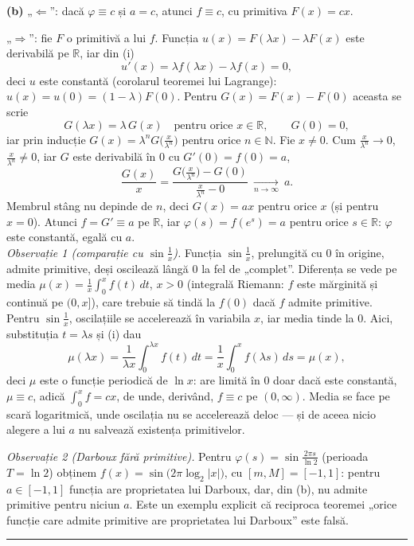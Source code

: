 \textbf{(b)} „$\Leftarrow$'': dacă $\varphi\equiv c$ și $a=c$, atunci $f\equiv c$, cu primitiva $F(x)=cx$.

„$\Rightarrow$'': fie $F$ o primitivă a lui $f$. Funcția $u(x)=F(\lambda x)-\lambda F(x)$ este derivabilă pe $\mathbb{R}$, iar din (i)
\[ u'(x)=\lambda f(\lambda x)-\lambda f(x)=0 , \]
deci $u$ este constantă (corolarul teoremei lui Lagrange): $u(x)=u(0)=(1-\lambda)F(0)$. Pentru $G(x)=F(x)-F(0)$ aceasta se scrie
\[ G(\lambda x)=\lambda\,G(x)\quad\text{pentru orice }x\in\mathbb{R},\qquad G(0)=0 , \]
iar prin inducție $G(x)=\lambda^{n}G\bigl(\frac{x}{\lambda^{n}}\bigr)$ pentru orice $n\in\mathbb{N}$. Fie $x\neq0$. Cum $\frac{x}{\lambda^{n}}\to0$, $\frac{x}{\lambda^{n}}\neq0$, iar $G$ este derivabilă în $0$ cu $G'(0)=f(0)=a$,
\[ \frac{G(x)}{x}=\frac{G\bigl(\frac{x}{\lambda^{n}}\bigr)-G(0)}{\frac{x}{\lambda^{n}}-0}\ \xrightarrow[n\to\infty]{}\ a . \]
Membrul stâng nu depinde de $n$, deci $G(x)=ax$ pentru orice $x$ (și pentru $x=0$). Atunci $f=G'\equiv a$ pe $\mathbb{R}$, iar $\varphi(s)=f(e^{s})=a$ pentru orice $s\in\mathbb{R}$: $\varphi$ este constantă, egală cu $a$.\\[2pt]
\emph{Observație 1 (comparație cu $\sin\frac1x$).} Funcția $\sin\frac1x$, prelungită cu $0$ în origine, admite primitive, deși oscilează lângă $0$ la fel de „complet''. Diferența se vede pe media $\mu(x)=\frac1x\int_{0}^{x}f(t)\,dt$, $x>0$ (integrală Riemann: $f$ este mărginită și continuă pe $(0,x]$), care trebuie să tindă la $f(0)$ dacă $f$ admite primitive. Pentru $\sin\frac1x$, oscilațiile se accelerează în variabila $x$, iar media tinde la $0$. Aici, substituția $t=\lambda s$ și (i) dau
\[ \mu(\lambda x)=\frac{1}{\lambda x}\int_{0}^{\lambda x}f(t)\,dt=\frac1x\int_{0}^{x}f(\lambda s)\,ds=\mu(x) , \]
deci $\mu$ este o funcție periodică de $\ln x$: are limită în $0$ doar dacă este constantă, $\mu\equiv c$, adică $\int_{0}^{x}f=cx$, de unde, derivând, $f\equiv c$ pe $(0,\infty)$. Media se face pe scară logaritmică, unde oscilația nu se accelerează deloc --- și de aceea nicio alegere a lui $a$ nu salvează existența primitivelor.

\emph{Observație 2 (Darboux fără primitive).} Pentru $\varphi(s)=\sin\frac{2\pi s}{\ln2}$ (perioada $T=\ln2$) obținem $f(x)=\sin\bigl(2\pi\log_{2}|x|\bigr)$, cu $[m,M]=[-1,1]$: pentru $a\in[-1,1]$ funcția are proprietatea lui Darboux, dar, din (b), nu admite primitive pentru niciun $a$. Este un exemplu explicit că reciproca teoremei „orice funcție care admite primitive are proprietatea lui Darboux'' este falsă.
\vspace{1mm}\hrule

